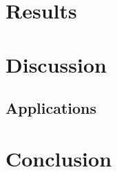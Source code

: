 \section{Results}
\lipsum[1]



\section{Discussion}
\lipsum[1]

\subsection{Applications}

\lipsum[1]

\section{Conclusion}
\lipsum[1]